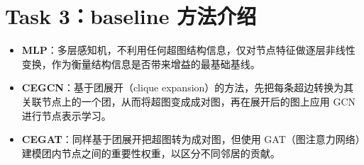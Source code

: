 
\section*{Task 3：baseline 方法介绍}
\begin{itemize}
    \item \textbf{MLP}：多层感知机，不利用任何超图结构信息，仅对节点特征做逐层非线性变换，作为衡量结构信息是否带来增益的最基础基线。
    \item \textbf{CEGCN}\cite{chien2022you,zhou2006learning,kipf2017semi}：基于团展开（clique expansion）的方法，先把每条超边转换为其关联节点上的一个团，从而将超图变成成对图，再在展开后的图上应用 GCN 进行节点表示学习。
    \item \textbf{CEGAT}\cite{chien2022you,zhou2006learning,velickovic2018graph}：同样基于团展开把超图转为成对图，但使用 GAT（图注意力网络）建模团内节点之间的重要性权重，以区分不同邻居的贡献。
    
    \vspace{0.5em} %
    

\end{itemize}
